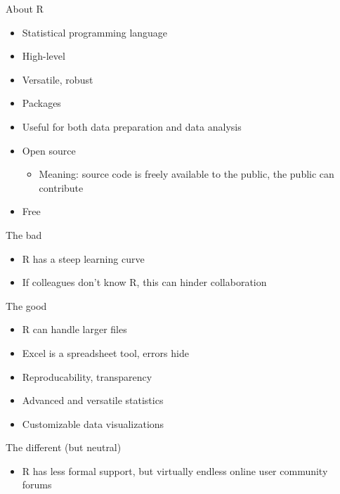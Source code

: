 \documentclass[ignorenonframetext,]{beamer}
\providecommand{\tightlist}{%
  \setlength{\itemsep}{0pt}\setlength{\parskip}{0pt}}
\begin{document}
\begin{frame}{About R}

\begin{itemize}
\tightlist
\item
  Statistical programming language
\item
  High-level
\item
  Versatile, robust
\item
  Packages
\item
  Useful for both data preparation and data analysis
\item
  Open source

  \begin{itemize}
  \tightlist
  \item
    Meaning: source code is freely available to the public, the public
    can contribute
  \end{itemize}
\item
  Free
\end{itemize}

\begin{block}{The bad}

\begin{itemize}
\tightlist
\item
  R has a steep learning curve
\item
  If colleagues don't know R, this can hinder collaboration
\end{itemize}

\end{block}

\begin{block}{The good}

\begin{itemize}
\tightlist
\item
  R can handle larger files
\item
  Excel is a spreadsheet tool, errors hide
\item
  Reproducability, transparency
\item
  Advanced and versatile statistics
\item
  Customizable data visualizations
\end{itemize}

\end{block}

\begin{block}{The different (but neutral)}

\begin{itemize}
\tightlist
\item
  R has less formal support, but virtually endless online user community
  forums
\end{itemize}

\end{block}

\end{frame}
\end{document}
